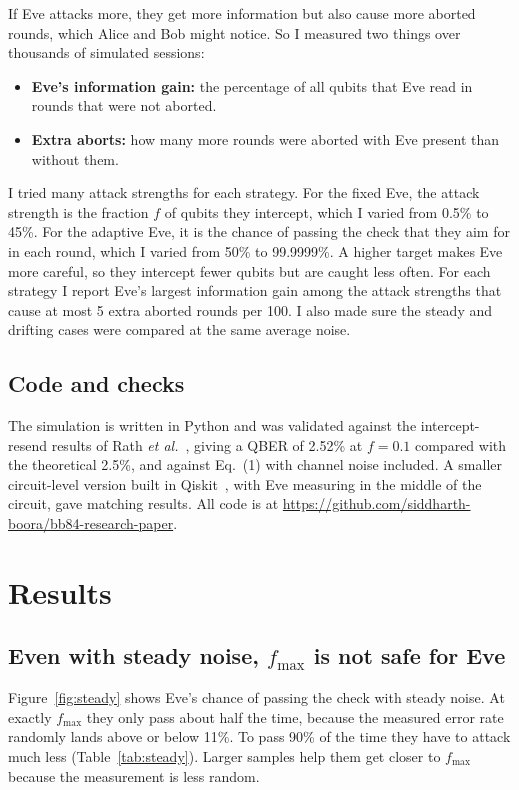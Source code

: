 \documentclass[11pt]{article}
\begin{document}
If Eve attacks more, they get more information but also cause more aborted rounds, which Alice and Bob might notice. So I measured two things over thousands of simulated sessions:
\begin{itemize}
\item \textbf{Eve's information gain:} the percentage of all qubits that Eve read in rounds that were not aborted.
\item \textbf{Extra aborts:} how many more rounds were aborted with Eve present than without them.
\end{itemize}
I tried many attack strengths for each strategy. For the fixed Eve, the attack strength is the fraction $f$ of qubits they intercept, which I varied from 0.5\% to 45\%. For the adaptive Eve, it is the chance of passing the check that they aim for in each round, which I varied from 50\% to 99.9999\%. A higher target makes Eve more careful, so they intercept fewer qubits but are caught less often. For each strategy I report Eve's largest information gain among the attack strengths that cause at most 5 extra aborted rounds per 100. I also made sure the steady and drifting cases were compared at the same average noise.

\subsection{Code and checks}

The simulation is written in Python and was validated against the intercept-resend results of Rath \emph{et al.}~\cite{Rath}, giving a QBER of 2.52\% at $f = 0.1$ compared with the theoretical 2.5\%, and against Eq.~(1) with channel noise included. A smaller circuit-level version built in Qiskit~\cite{Qiskit}, with Eve measuring in the middle of the circuit, gave matching results. All code is at \url{https://github.com/siddharth-boora/bb84-research-paper}.

\section{Results}

\subsection{Even with steady noise, \texorpdfstring{$f_{\max}$}{f\_max} is not safe for Eve}

Figure~\ref{fig:steady} shows Eve's chance of passing the check with steady noise. At exactly $f_{\max}$ they only pass about half the time, because the measured error rate randomly lands above or below 11\%. To pass 90\% of the time they have to attack much less (Table~\ref{tab:steady}). Larger samples help them get closer to $f_{\max}$ because the measurement is less random.
\end{document}

